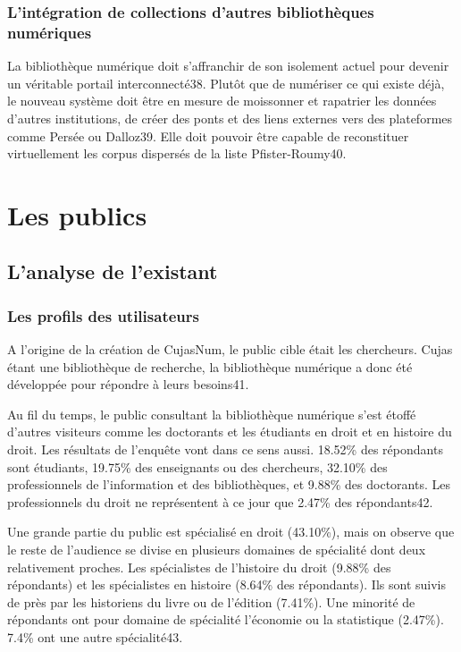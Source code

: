 \subsubsection{L’intégration de collections d’autres bibliothèques numériques}

La bibliothèque numérique doit s’affranchir de son isolement actuel pour devenir un véritable portail interconnecté38. Plutôt que de numériser ce qui existe déjà, le nouveau système doit être en mesure de moissonner et rapatrier les données d’autres institutions, de créer des ponts et des liens externes vers des plateformes comme Persée ou Dalloz39. Elle doit pouvoir être capable de reconstituer virtuellement les corpus dispersés de la liste Pfister-Roumy40.  



\section{Les publics}

\subsection{L’analyse de l’existant} 

\subsubsection{Les profils des utilisateurs}

A l’origine de la création de CujasNum, le public cible était les chercheurs. Cujas étant une bibliothèque de recherche, la bibliothèque numérique a donc été développée pour répondre à leurs besoins41. 

Au fil du temps, le public consultant la bibliothèque numérique s’est étoffé d’autres visiteurs comme les doctorants et les étudiants en droit et en histoire du droit. Les résultats de l’enquête vont dans ce sens aussi. 18.52\% des répondants sont étudiants, 19.75\% des enseignants ou des chercheurs, 32.10\% des professionnels de l’information et des bibliothèques, et 9.88\% des doctorants. Les professionnels du droit ne représentent à ce jour que 2.47\% des répondants42.  

Une grande partie du public est spécialisé en droit (43.10\%), mais on observe que le reste de l’audience se divise en plusieurs domaines de spécialité dont deux relativement proches. Les spécialistes de l’histoire du droit (9.88\% des répondants) et les spécialistes en histoire (8.64\% des répondants). Ils sont suivis de près par les historiens du livre ou de l’édition (7.41\%). Une minorité de répondants ont pour domaine de spécialité l’économie ou la statistique (2.47\%). 7.4\% ont une autre spécialité43. 

